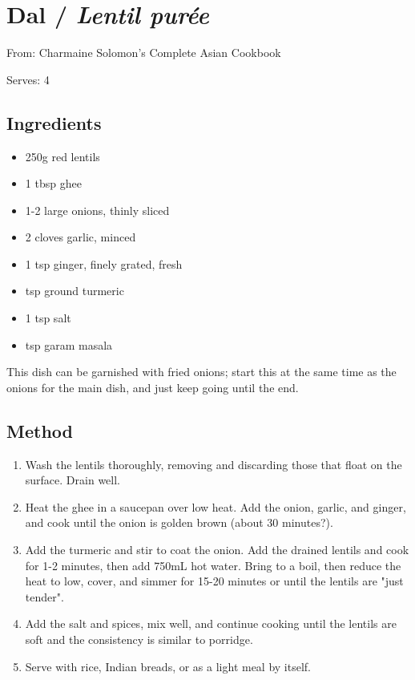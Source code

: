 \section{Dal / \emph{Lentil pur\'{e}e}}


From: Charmaine Solomon's Complete Asian Cookbook

Serves: 4

\subsection{Ingredients}

\begin{itemize}
	\item 250g red lentils
	\item 1 tbsp ghee
	\item 1-2 large onions, thinly sliced
	\item 2 cloves garlic, minced
	\item 1 tsp ginger, finely grated, fresh
	\item {} tsp ground turmeric
	\item 1 tsp salt
	\item {} tsp garam masala
\end{itemize}

This dish can be garnished with fried onions; start this at the same time as the onions for the main dish, and just keep going until the end.

\subsection{Method}

\begin{enumerate}
	\item Wash the lentils thoroughly, removing and discarding those that float on the surface. Drain well.
	\item Heat the ghee in a saucepan over low heat. Add the onion, garlic, and ginger, and cook until the onion is golden brown (about 30 minutes?).
	\item Add the turmeric and stir to coat the onion. Add the drained lentils and cook for 1-2 minutes, then add 750mL hot water. Bring to a boil, then reduce the heat to low, cover, and simmer for 15-20 minutes or until the lentils are "just tender".
	\item Add the salt and spices, mix well, and continue cooking until the lentils are soft and the consistency is similar to porridge.
	\item Serve with rice, Indian breads, or as a light meal by itself.
\end{enumerate}
